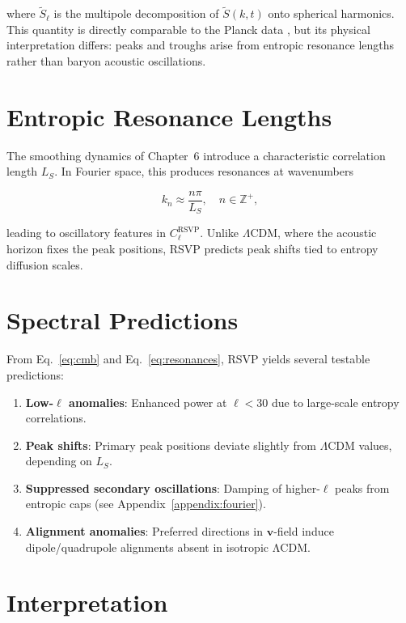 \documentclass[12pt]{report}
\begin{document}
where $\tilde{S}_\ell$ is the multipole decomposition of $\tilde{S}(k,t)$ onto spherical harmonics.  
This quantity is directly comparable to the Planck data \citep{Planck2020}, but its physical interpretation differs: peaks and troughs arise from entropic resonance lengths rather than baryon acoustic oscillations.

\section{Entropic Resonance Lengths}

The smoothing dynamics of Chapter~6 introduce a characteristic correlation length $L_S$. In Fourier space, this produces resonances at wavenumbers

\begin{equation}
k_n \approx \frac{n\pi}{L_S}, \quad n \in \mathbb{Z}^+,
\label{eq:resonances}
\end{equation}

leading to oscillatory features in $C_\ell^{\text{RSVP}}$. Unlike $\Lambda$CDM, where the acoustic horizon fixes the peak positions, RSVP predicts peak shifts tied to entropy diffusion scales.

\section{Spectral Predictions}

From Eq.~\eqref{eq:cmb} and Eq.~\eqref{eq:resonances}, RSVP yields several testable predictions:

\begin{enumerate}
    \item \textbf{Low-$\ell$ anomalies}: Enhanced power at $\ell < 30$ due to large-scale entropy correlations.  
    \item \textbf{Peak shifts}: Primary peak positions deviate slightly from $\Lambda$CDM values, depending on $L_S$.  
    \item \textbf{Suppressed secondary oscillations}: Damping of higher-$\ell$ peaks from entropic caps (see Appendix~\ref{appendix:fourier}).  
    \item \textbf{Alignment anomalies}: Preferred directions in $\mathbf{v}$-field induce dipole/quadrupole alignments absent in isotropic ΛCDM.  
\end{enumerate}

\section{Interpretation}
\end{document}
